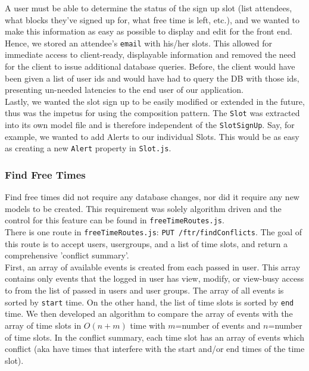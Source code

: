 \documentclass[11pt]{article}   %
\begin{document}
\noindent A user must be able to determine the status of the sign up slot (list attendees, what blocks they've signed up for, what free time is left, etc.), and we wanted to make this information as easy as possible to display and edit for the front end. Hence, we stored an attendee's \texttt{email} with his/her slots. This allowed for immediate access to client-ready, displayable information and removed the need for the client to issue additional database queries. Before, the client would have been given a list of user ids and would have had to query the DB with those ids, presenting un-needed latencies to the end user of our application.\\

\noindent Lastly, we wanted the slot sign up to be easily modified or extended in the future, thus was the impetus for using the composition pattern. The \texttt{Slot} was extracted into its own model file and is therefore independent of the \texttt{SlotSignUp}. Say, for example, we wanted to add Alerts to our individual Slots. This would be as easy as creating a new \texttt{Alert} property in \texttt{Slot.js}.

\subsubsection{Find Free Times}
\noindent Find free times did not require any database changes, nor did it require any new models to be created. This requirement was solely algorithm driven and the control for this feature can be found in \texttt{freeTimeRoutes.js}. \\

\noindent There is one route in \texttt{freeTimeRoutes.js}: \texttt{PUT /ftr/findConflicts}.  The goal of this route is to accept users, usergroups, and a list of time slots, and return a comprehensive 'conflict summary'. \\

\noindent First, an array of available events is created from each passed in user.  This array contains only events that the logged in user  has view, modify, or view-busy access to from the list of passed in users and user groups.  The array of all events is sorted by \texttt{start} time. On the other hand, the list of time slots is sorted by \texttt{end} time.  We then developed an algorithm to compare the array of events with the array of time slots in $O(n+m)$ time with $m$=number of events and $n$=number of time slots.  In the conflict summary, each time slot has an array of events which conflict (aka have times that interfere with the start and/or end times of the time slot). \\
\end{document}
